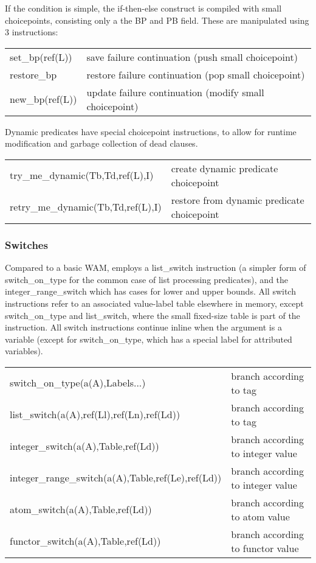 If the condition is simple, the if-then-else construct is compiled with
small choicepoints, consisting only a the BP and PB field. These are
manipulated using 3 instructions:

\begin{tabular}{|p{}|p{}|}
\hline
set_bp(ref(L))          & save failure continuation (push small choicepoint) \\
restore_bp              & restore failure continuation (pop small choicepoint) \\
new_bp(ref(L))          & update failure continuation (modify small choicepoint) \\
\hline
\end{tabular}

Dynamic predicates have special choicepoint instructions, to allow for
runtime modification and garbage collection of dead clauses.

\begin{tabular}{|p{}|p{}|}
\hline
try_me_dynamic(Tb,Td,ref(L),I)  & create dynamic predicate choicepoint \\
retry_me_dynamic(Tb,Td,ref(L),I)& restore from dynamic predicate choicepoint \\
\hline
\end{tabular}


\subsubsection{Switches}
Compared to a basic WAM, {\eclipse} employs a list_switch instruction
(a simpler form of switch_on_type for the common case of list
processing predicates), and the integer_range_switch which has cases
for lower and upper bounds. All switch instructions refer to an associated
value-label table elsewhere in memory, except switch_on_type and list_switch,
where the small fixed-size table is part of the instruction.
All switch instructions continue inline when the argument is a variable
(except for switch_on_type, which has a special label for attributed
variables).

\begin{tabular}{|p{}|p{}|}
\hline
switch_on_type(a(A),Labels...)           & branch according to tag \\
list_switch(a(A),ref(Ll),ref(Ln),ref(Ld))& branch according to tag \\
integer_switch(a(A),Table,ref(Ld))       & branch according to integer value \\
integer_range_switch(a(A),Table,ref(Le),ref(Ld)) & branch according to integer value \\
atom_switch(a(A),Table,ref(Ld))          & branch according to atom value \\
functor_switch(a(A),Table,ref(Ld))       & branch according to functor value \\
\hline
\end{tabular}


